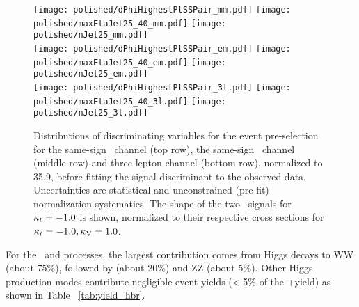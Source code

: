 \begin{figure}[!htb]
\centering
        \texttt{[image: polished/dPhiHighestPtSSPair\_mm.pdf]}
        \texttt{[image: polished/maxEtaJet25\_40\_mm.pdf]}
        \texttt{[image: polished/nJet25\_mm.pdf]} \\
        \texttt{[image: polished/dPhiHighestPtSSPair\_em.pdf]}
        \texttt{[image: polished/maxEtaJet25\_40\_em.pdf]}
        \texttt{[image: polished/nJet25\_em.pdf]} \\
        \texttt{[image: polished/dPhiHighestPtSSPair\_3l.pdf]}
        \texttt{[image: polished/maxEtaJet25\_40\_3l.pdf]}
        \texttt{[image: polished/nJet25\_3l.pdf]} 
\caption[Discriminating variables for the event pre-selection, $2lss-\mumu$.]{Distributions of discriminating variables for the event pre-selection for the same-sign \mumu\ channel (top row), the same-sign \emu\ channel (middle row) and three lepton channel (bottom row), normalized to 35.9\fbinv, before fitting the signal discriminant to the observed data. Uncertainties are statistical and unconstrained (pre-fit) normalization systematics. The shape of the two \tH\ signals for $\kappa_t=-1.0$ is shown, normalized to their respective cross sections for $\kappa_t=-1.0, \kappa_\text{V}=1.0$.}
\label{fig:input_vars_presel}
\end{figure}

For the \tH\ and \ttH processes, the largest contribution comes from Higgs decays to WW (about 75\%), followed
by \tautau (about 20\%) and ZZ (about 5\%). Other Higgs production modes contribute negligible event yields (< 5\% of the \tH +\ttH yield) as shown in Table ~\ref{tab:yield_hbr}.

